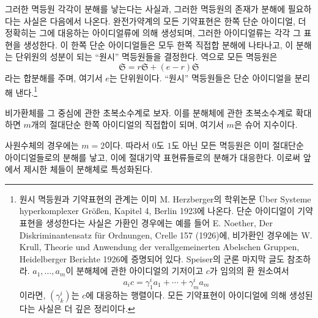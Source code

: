 \documentclass[11pt]{article}
\providecommand{\mS}{\mathfrak{S}}
\begin{document}
그러한 멱등원 각각이 분해를 낳는다는 사실과, 그러한 멱등원의 존재가 분해에 필요하다는 사실은 다음에서 나온다. 완전가약계의 모든 기약표현은 한쪽 단순 아이디얼, 더 정확히는 그에 대응하는 아이디얼류에 의해 생성되며, 그러한 아이디얼류는 각각 그 표현을 생성한다. 이 한쪽 단순 아이디얼들은 모두 한쪽 직접합 분해에 나타나고, 이 분해는 단위원의 성분이 되는 ``원시'' 멱등원들을 결정한다. 역으로 모든 멱등원은
\[
\mS=r\mS+(e-r)\mS
\]
라는 합분해를 주며, 여기서 $e$는 단위원이다. ``원시'' 멱등원들은 단순 아이디얼을 분리해 낸다.\footnote{원시 멱등원과 기약표현의 관계는 이미 M. Herzberger의 학위논문 Über Systeme hyperkomplexer Größen, Kapitel 4, Berlin 1923에 나온다. 단순 아이디얼이 기약표현을 생성한다는 사실은 가환인 경우에는 예를 들어 E. Noether, Der Diskriminantensatz für Ordnungen, Crelle 157 (1926)에, 비가환인 경우에는 W. Krull, Theorie und Anwendung der verallgemeinerten Abelschen Gruppen, Heidelberger Berichte 1926에 증명되어 있다. Speiser의 군론 마지막 글도 참조하라. $a_1,\ldots,a_m$이 분해체에 관한 아이디얼의 기저이고 $c$가 임의의 환 원소여서
\[
a_i c=\gamma^i_1a_1+\cdots+\gamma^i_ma_m
\]
이라면, $(\gamma^i_k)$는 $c$에 대응하는 행렬이다. 모든 기약표현이 아이디얼에 의해 생성된다는 사실은 더 깊은 정리이다.}

비가환체를 그 중심에 관한 초복소수계로 보자. 이를 분해체에 관한 초복소수계로 확대하면 $m$개의 절대단순 한쪽 아이디얼의 직접합이 되며, 여기서 $m$은 슈어 지수이다.

사원수체의 경우에는 $m=2$이다. 따라서 $0$도 $1$도 아닌 모든 멱등원은 이미 절대단순 아이디얼들로의 분해를 낳고, 이에 절대기약 표현류들로의 분해가 대응한다. 이로써 앞에서 제시한 체들이 분해체로 특성화된다.
\end{document}
